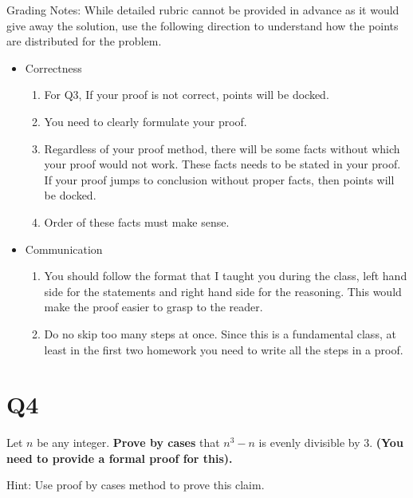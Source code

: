 \documentclass[12pt]{exam}
\begin{document}
Grading Notes:
While detailed rubric cannot be provided in advance as it would give away the solution, use the following direction to understand how the points are distributed for the problem.
\begin{itemize}
    \item Correctness
    \begin{enumerate}
        \item For Q3, If your proof is not correct, points will be docked. 
        \item You need to clearly formulate your proof.
        \item Regardless of your proof method, there will be some facts without which your proof would not work. These facts needs to be stated in your proof. If your proof jumps to conclusion without proper facts, then points will be docked.
        \item Order of these facts must make sense. 
    \end{enumerate}
        
    \item Communication 
    \begin{enumerate}
        \item You should follow the format that I taught you during the class, left hand side for the statements and right hand side for the reasoning. This would make the proof easier to grasp to the reader.
        \item Do no skip too many steps at once. Since this is a fundamental class, at least in the first two homework you need to write all the steps in a proof. 
    \end{enumerate}
        
\end{itemize}



\section{Q4}
Let $n$ be any integer. \textbf{Prove by cases} that $n^3-n$ is evenly divisible by $3$. \textbf{(You need to provide a formal proof for this).}


Hint: Use proof by cases method to prove this claim.
\end{document}
